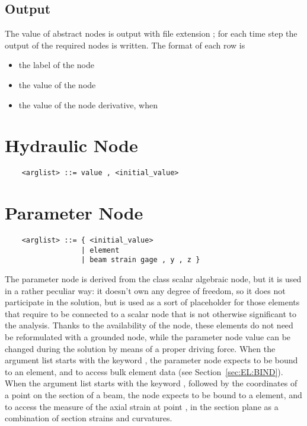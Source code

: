 \subsection{Output}
The value of abstract nodes is output with file extension ; for
each time step the output of the required nodes is written.
The format of each row is
\begin{itemize}
    \item the label of the node
    \item the value of the node
    \item the value of the node derivative, when 
\end{itemize}



\section{Hydraulic Node}
\begin{verbatim}
    <arglist> ::= value , <initial_value>
\end{verbatim}



\section{Parameter Node}
\begin{verbatim}
    <arglist> ::= { <initial_value>
                  | element 
                  | beam strain gage , y , z }
\end{verbatim}
The parameter node is derived from the class scalar algebraic node, but it
is used in a rather peculiar way: it doesn't own any degree of freedom,
so it does not participate in the solution, but is used as a sort of
placeholder for those elements that require to be connected to a scalar node
that is not otherwise significant to the analysis.
Thanks to the availability of the  node, these elements
do not need be reformulated with a grounded node, while the parameter
node value can be changed during the solution by means of a proper driving 
force.
When the argument list starts with the keyword , the parameter
node expects to be bound to an element, and to access bulk element data 
(see Section~\ref{sec:EL:BIND}).
When the argument list starts with the keyword ,
followed by the coordinates of a point on the section of a beam,
the  node expects to be bound to a  element,
and to access the measure of the axial strain at point , 
in the section plane as a combination of section strains and curvatures.

